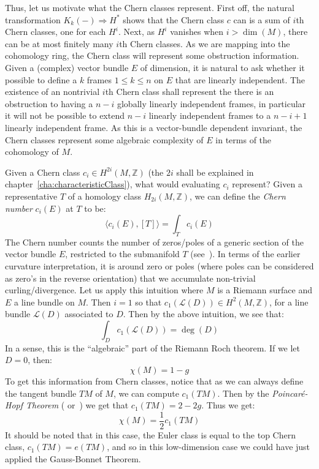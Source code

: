\documentclass{book}
\newcommand{\Z}{{\mathbb{Z}}}
\newcommand{\CL}{{\mathcal{L}}}
\newcommand{\Rw}{\Rightarrow}
\begin{document}
Thus, let us motivate what the Chern classes represent. First off, the natural transformation $K_k(-) \Rw H^*$
shows that the Chern class $c$ can is a sum of $i$th Chern classes, one for each $H^i$. Next, as $H^i$
vanishes when $i > \dim(M)$, there can be at most finitely many $i$th Chern classes. As we are mapping into
the cohomology ring, the Chern class will represent some obstruction information. Given a (complex) vector
bundle $E$ of dimension, it is natural to ask whether it possible to define a $k$ frames $1\le k \le n$ on $E$
that are linearly independent. The existence of an nontrivial $i$th Chern class shall represent the there is
an obstruction to having a $n-i$ globally linearly independent frames, in particular it will not be possible
to extend $n-i$ linearly independent frames to a $n-i+1$ linearly independent frame. As this is a
vector-bundle dependent invariant, the Chern classes represent some algebraic complexity of $E$ in terms of
the cohomology of $M$.

Given a Chern class $c_i \in H^{2i}(M, \Z)$ (the $2i$ shall be explained in
chapter~\ref{cha:characteristicClass}), what would evaluating $c_i$ represent? Given a representative $T$ of
a homology class $H_{2i}(M, \Z)$, we can define the \emph{Chern number} $c_i(E)$ at $T$ to be:
\[
  \langle c_i(E), [T] \rangle = \int_T c_i(E)
\]
The Chern number counts the number of zeros/poles of a generic section of the vector bundle $E$, restricted to the
submanifold $T$ (see~\cite{NateKTheory}). In terms of the earlier curvature interpretation, it is around
zero or poles (where poles can be considered as zero's in the reverse orientation) that we accumulate non-trivial
curling/divergence. Let us apply this intuition where $M$ is a Riemann surface and $E$ a line bundle on $M$.
Then $i = 1$ so that $c_1(\CL(D)) \in H^2(M, \Z)$, for a line bundle $\CL(D)$ associated to $D$. Then by the
above intuition, we see that:
\[
  \int_D c_1(\CL(D)) = \deg(D)
\]
In a sense, this is the ``algebraic'' part of the Riemann Roch theorem. If we let $D = 0$, then:
\[
  \chi(M) = 1-g
\]
To get this information from Chern classes, notice that as we can always define the tangent bundle $TM$ of
$M$, we can compute $c_1(TM)$. Then by the \emph{Poincar\'e-Hopf Theorem} (\cite{NateAlgTop}
or~\cite{NateDiffGeo}) we get that $c_1(TM) = 2-2g$. Thus we get:
\[
  \chi(M) = \frac{1}{2}c_1(TM)
\]
It should be noted that in this case, the Euler class is equal to the top Chern class, $c_1(TM) = e(TM)$, and
so in this low-dimension case we could have just applied the Gauss-Bonnet Theorem.
\end{document}
